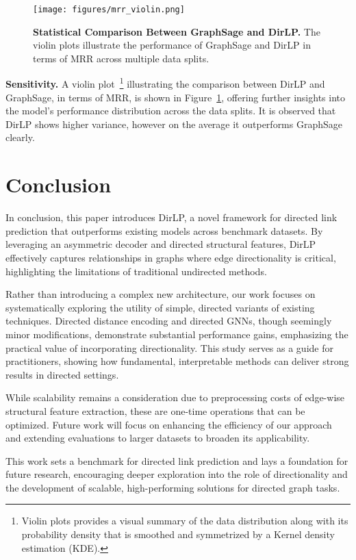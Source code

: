 \documentclass{article}
\begin{document}
\begin{figure}[h]
    \label{fig:violin_plot}
    \centering
    \texttt{[image: figures/mrr\_violin.png]}
    \caption{\textbf{Statistical Comparison Between GraphSage and DirLP.} The violin plots illustrate the performance of GraphSage and DirLP in terms of MRR across multiple data splits.}
    \label{fig:mrr_violin}
\end{figure}

\textbf{Sensitivity.} A violin plot~\footnote{Violin plots provides a visual summary of the data distribution along with its probability density that is smoothed and symmetrized by a Kernel density estimation (KDE).} illustrating the comparison between DirLP and GraphSage, in terms of MRR, is shown in Figure~\ref{fig:mrr_violin}, offering further insights into the model's performance distribution across the data splits. It is observed that DirLP shows higher variance, however on the average it outperforms GraphSage clearly. 

\section{Conclusion}\label{sec:conclusion}
In conclusion, this paper introduces DirLP, a novel framework for directed link prediction that outperforms existing models across benchmark datasets. By leveraging an asymmetric decoder and directed structural features, DirLP effectively captures relationships in graphs where edge directionality is critical, highlighting the limitations of traditional undirected methods.

Rather than introducing a complex new architecture, our work focuses on systematically exploring the utility of simple, directed variants of existing techniques. Directed distance encoding and directed GNNs, though seemingly minor modifications, demonstrate substantial performance gains, emphasizing the practical value of incorporating directionality. This study serves as a guide for practitioners, showing how fundamental, interpretable methods can deliver strong results in directed settings.

While scalability remains a consideration due to preprocessing costs of edge-wise structural feature extraction, these are one-time operations that can be optimized. Future work will focus on enhancing the efficiency of our approach and extending evaluations to larger datasets to broaden its applicability.

This work sets a benchmark for directed link prediction and lays a foundation for future research, encouraging deeper exploration into the role of directionality and the development of scalable, high-performing solutions for directed graph tasks.
\end{document}
